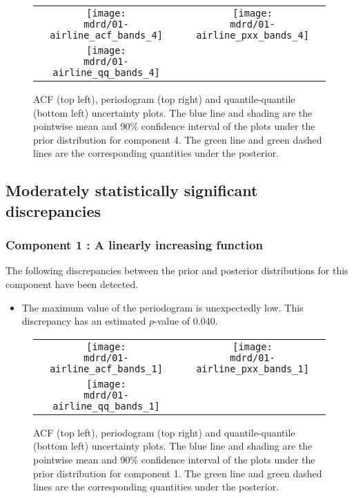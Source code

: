 \documentclass{article} %
\begin{document}
\begin{figure}[H]
\newcommand{\wmgd}{0.5\columnwidth}
\newcommand{\hmgd}{3.0cm}
\newcommand{\mdrd}{01-airline}
\newcommand{\mbm}{\hspace{-0.3cm}}
\begin{tabular}{cc}
\mbm \texttt{[image: \\mdrd/01-airline\_acf\_bands\_4]} & \texttt{[image: \\mdrd/01-airline\_pxx\_bands\_4]} \\
\mbm \texttt{[image: \\mdrd/01-airline\_qq\_bands\_4]}
\end{tabular}
\caption{
ACF (top left), periodogram (top right) and quantile-quantile (bottom left) uncertainty plots.
The blue line and shading are the pointwise mean and 90\% confidence interval of the plots under the prior distribution for component 4.
The green line and green dashed lines are the corresponding quantities under the posterior.}
\label{fig:check4}
\end{figure}

\subsection{Moderately statistically significant discrepancies}

\subsubsection{Component 1 : A linearly increasing function}


The following discrepancies between the prior and posterior distributions for this component have been detected.

\begin{itemize}

    \item The maximum value of the periodogram is unexpectedly low. This discrepancy has an estimated $p$-value of 0.040.
\end{itemize}



\begin{figure}[H]
\newcommand{\wmgd}{0.5\columnwidth}
\newcommand{\hmgd}{3.0cm}
\newcommand{\mdrd}{01-airline}
\newcommand{\mbm}{\hspace{-0.3cm}}
\begin{tabular}{cc}
\mbm \texttt{[image: \\mdrd/01-airline\_acf\_bands\_1]} & \texttt{[image: \\mdrd/01-airline\_pxx\_bands\_1]} \\
\mbm \texttt{[image: \\mdrd/01-airline\_qq\_bands\_1]}
\end{tabular}
\caption{
ACF (top left), periodogram (top right) and quantile-quantile (bottom left) uncertainty plots.
The blue line and shading are the pointwise mean and 90\% confidence interval of the plots under the prior distribution for component 1.
The green line and green dashed lines are the corresponding quantities under the posterior.}
\label{fig:check1}
\end{figure}
\end{document}
